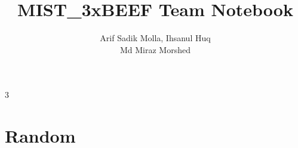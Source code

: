 \documentclass[8pt, a4paper, onesided]{article}
\title{\vspace{-2.5ex}MIST\_3xBEEF Team Notebook}
\author{Arif Sadik Molla, Ihsanul Huq\\Md Miraz Morshed}
\date{}
\begin{document}
\begin{landscape}
\begin{multicols*}{3}

\maketitle
\vspace{-7ex}
\tableofcontents
\pagestyle{fancy}
 
\raggedbottom


\section{Random}
    
\end{multicols*}


\end{landscape}
\end{document}
